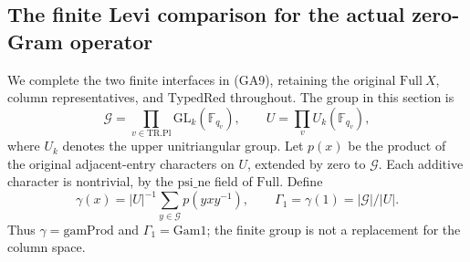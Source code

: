 \subsection{The finite Levi comparison for the actual zero-Gram operator}
\label{sec:flag-finite-levi}

We complete the two finite interfaces in (GA9), retaining the
original \(\mathrm{Full}\ X\), column representatives, and
\(\mathrm{TypedRed}\) throughout. The group in this section is
\[
 \mathcal G=\prod_{v\in\mathrm{TR.Pl}}\mathrm{GL}_k(\mathbb F_{q_v}),
 \qquad U=\prod_v U_k(\mathbb F_{q_v}),
\]
where \(U_k\) denotes the upper unitriangular group. Let \(p(x)\)
be the product of the original adjacent-entry characters on \(U\),
extended by zero to \(\mathcal G\). Each additive character is
nontrivial, by the \(\mathrm{psi\_ne}\) field of \(\mathrm{Full}\).
Define
\[
 \gamma(x)=|U|^{-1}\sum_{y\in\mathcal G}p(yxy^{-1}),
 \qquad \Gamma_1=\gamma(1)=|\mathcal G|/|U|.
 \tag{FL1}
\]
Thus \(\gamma=\mathrm{gamProd}\) and \(\Gamma_1=\mathrm{Gam1}\);
the finite group is not a replacement for the column space.

